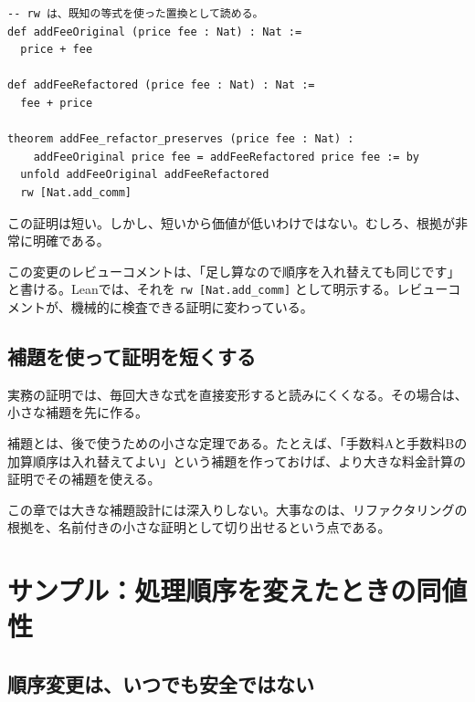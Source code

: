 \begin{listing}[htbp]
\begin{verbatim}
-- rw は、既知の等式を使った置換として読める。
def addFeeOriginal (price fee : Nat) : Nat :=
  price + fee

def addFeeRefactored (price fee : Nat) : Nat :=
  fee + price

theorem addFee_refactor_preserves (price fee : Nat) :
    addFeeOriginal price fee = addFeeRefactored price fee := by
  unfold addFeeOriginal addFeeRefactored
  rw [Nat.add_comm]
\end{verbatim}
\caption{\texttt{rw} による書き換え}
\label{lst:ch03_rw_comm}
\end{listing}

この証明は短い。しかし、短いから価値が低いわけではない。むしろ、根拠が非常に明確である。

\begin{softwarebox}
この変更のレビューコメントは、「足し算なので順序を入れ替えても同じです」と書ける。Leanでは、それを \texttt{rw [Nat.add\_comm]} として明示する。レビューコメントが、機械的に検査できる証明に変わっている。
\end{softwarebox}

\subsection{補題を使って証明を短くする}

実務の証明では、毎回大きな式を直接変形すると読みにくくなる。その場合は、小さな補題を先に作る。

補題とは、後で使うための小さな定理である。たとえば、「手数料Aと手数料Bの加算順序は入れ替えてよい」という補題を作っておけば、より大きな料金計算の証明でその補題を使える。

この章では大きな補題設計には深入りしない。大事なのは、リファクタリングの根拠を、名前付きの小さな証明として切り出せるという点である。


\section{サンプル：処理順序を変えたときの同値性}

\subsection{順序変更は、いつでも安全ではない}

